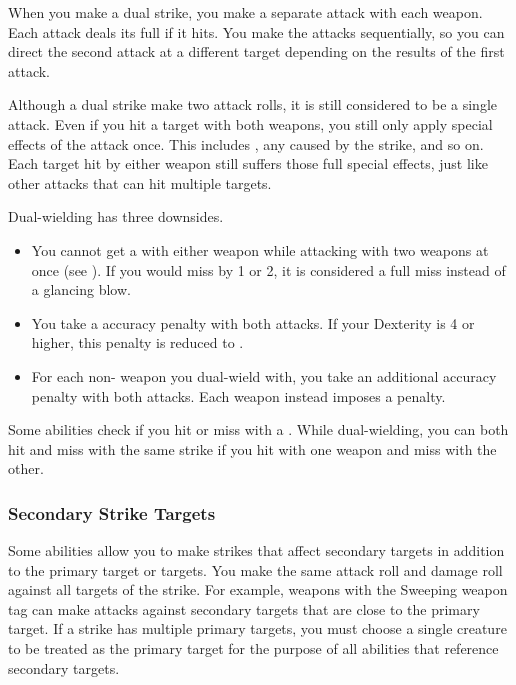      When you make a dual strike, you make a separate attack with each weapon.
      Each attack deals its full  if it hits.
      You make the attacks sequentially, so you can direct the second attack at a different target depending on the results of the first attack.

      Although a dual strike make two attack rolls, it is still considered to be a single attack.
      Even if you hit a target with both weapons, you still only apply special effects of the attack once.
      This includes , any  caused by the strike, and so on.
      Each target hit by either weapon still suffers those full special effects, just like other attacks that can hit multiple targets.

      Dual-wielding has three downsides.
      \begin{itemize}
        \item You cannot get a  with either weapon while attacking with two weapons at once (see ).
          If you would miss by 1 or 2, it is considered a full miss instead of a glancing blow.
        \item You take a  accuracy penalty with both attacks.
          If your Dexterity is 4 or higher, this penalty is reduced to .
        \item For each non- weapon you dual-wield with, you take an additional  accuracy penalty with both attacks.
          Each  weapon instead imposes a  penalty.
      \end{itemize}

      Some abilities check if you hit or miss with a .
      While dual-wielding, you can both hit and miss with the same strike if you hit with one weapon and miss with the other.

    \subsubsection{Secondary Strike Targets}\label{Secondary Strike Targets}
      Some abilities allow you to make strikes that affect secondary targets in addition to the primary target or targets.
      You make the same attack roll and damage roll against all targets of the strike.
      For example, weapons with the Sweeping weapon tag can make attacks against secondary targets that are close to the primary target.
      If a strike has multiple primary targets, you must choose a single creature to be treated as the primary target for the purpose of all abilities that reference secondary targets.

